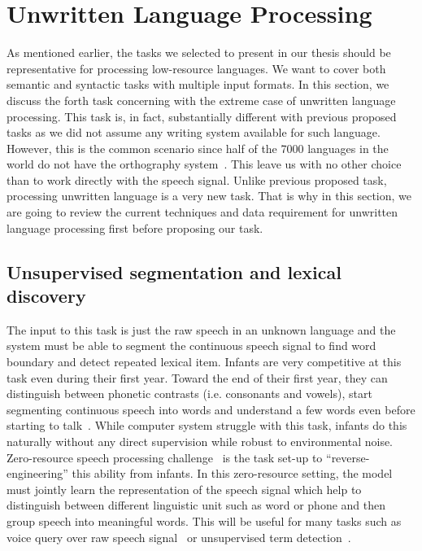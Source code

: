\documentclass[12pt,twoside,final,hidelinks]{ltthesis}
\theoremstyle{definition}
\begin{document}
\section{Unwritten Language Processing}
As mentioned earlier, the tasks we selected to present in our thesis should be representative for processing low-resource languages. 
We want to cover both semantic and syntactic tasks with multiple input formats. In this section, we discuss the forth task concerning with the 
extreme case of unwritten language processing. This task is, in fact, substantially different with previous proposed tasks as we did not assume any writing system available for such language. 
However, this is the common scenario since half of the 7000 languages in the world do not have the orthography system~\cite{lewis2009}. This leave us with 
no other choice than to work directly with the speech signal. Unlike previous proposed task, processing unwritten language is a very new task. That is why 
in this section, we are going to review the current techniques and data requirement for unwritten language processing first before proposing our task. 

\subsection{Unsupervised segmentation and lexical discovery}
The input to this task is just the raw speech in an unknown language and the system must 
be able to segment the continuous speech signal to find word boundary and detect repeated lexical item.
Infants are very competitive at this task even during their first year. 
Toward the end of their first year, they can distinguish between phonetic contrasts (i.e. consonants and vowels), 
start segmenting continuous speech into words and understand a few words even before starting to talk~\cite{RaSaNen:2012:CMP:2318326.2318449}. 
While computer system struggle with this task, infants do this naturally without any direct supervision while robust to environmental noise. 
Zero-resource speech processing challenge~\cite{Versteegh201667} is the task set-up to ``reverse-engineering'' this ability from infants. 
In this zero-resource setting, the model must jointly learn the representation of the speech signal which help to distinguish between different 
linguistic unit such as word or phone and then group speech into meaningful words. This will be useful for many tasks such as 
voice query over raw speech signal~\cite{Park:2007:UPD:1329638} or unsupervised term detection~\cite{6163965}.
\end{document}
